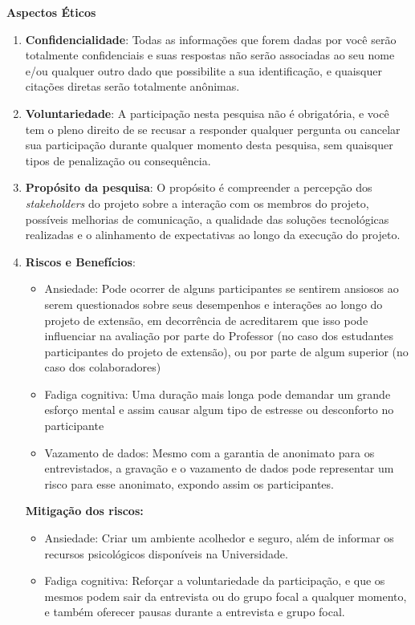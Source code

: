 \textbf{Aspectos Éticos}
\begin{enumerate}
    \item \textbf{Confidencialidade}: Todas as informações que forem dadas por você serão totalmente confidenciais e suas respostas não serão associadas ao seu nome e/ou qualquer outro dado que possibilite a sua identificação, e quaisquer citações diretas serão totalmente anônimas.
    \item \textbf{Voluntariedade}: A participação nesta pesquisa não é obrigatória, e você tem o pleno direito de se recusar a responder qualquer pergunta ou cancelar sua participação durante qualquer momento desta pesquisa, sem quaisquer tipos de penalização ou consequência.
    \item \textbf{Propósito da pesquisa}: O propósito é compreender a percepção dos \textit{stakeholders} do projeto sobre a interação com os membros do projeto, possíveis melhorias de comunicação, a qualidade das soluções tecnológicas realizadas e o alinhamento de expectativas ao longo da execução do projeto.
    \item \textbf{Riscos e Benefícios}:
    \begin{itemize}
        \item Ansiedade: Pode ocorrer de alguns participantes se sentirem ansiosos ao serem questionados sobre seus desempenhos e interações ao longo do projeto de extensão, em decorrência de acreditarem que isso pode influenciar na avaliação por parte do Professor (no caso dos estudantes participantes do projeto de extensão), ou por parte de algum superior  (no caso dos colaboradores)
        \item Fadiga cognitiva: Uma duração mais longa pode demandar um grande esforço mental e assim causar algum tipo de estresse ou desconforto no participante
        \item Vazamento de dados: Mesmo com a garantia de anonimato para os entrevistados, a gravação e o vazamento de dados pode representar um risco para esse anonimato, expondo assim os participantes.
    \end{itemize}
    \textbf{Mitigação dos riscos:}
    \begin{itemize}
        \item Ansiedade: Criar um ambiente acolhedor e seguro, além de informar os recursos psicológicos disponíveis na Universidade.
        \item Fadiga cognitiva: Reforçar a voluntariedade da participação, e que os mesmos podem sair da entrevista ou do grupo focal a qualquer momento, e também oferecer pausas durante a entrevista e grupo focal.

\end{itemize}
\end{enumerate}
